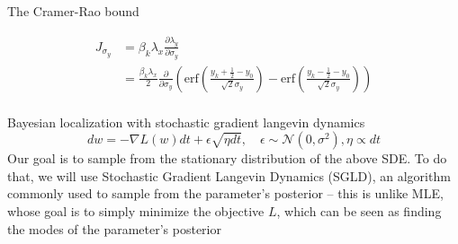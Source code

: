\documentclass[aspectratio=169]{beamer}
\begin{document}
\begin{frame}{The Cramer-Rao bound}

\begin{align*}
J_{\sigma_{y}} &= \beta_{k}\lambda_{x}\frac{\partial \lambda_{y}}{\partial \sigma_{y}} \\
&= \frac{\beta_{k}\lambda_{x}}{2}\frac{\partial}{\partial \sigma_{y}}\left(\mathrm{erf}\left(\frac{y_{k}+\frac{1}{2}-y_{0}}{\sqrt{2}\sigma_{y}}\right) -\mathrm{erf}\left(\frac{y_{k}-\frac{1}{2}-y_{0}}{\sqrt{2}\sigma_{y}}\right)\right)\\
\end{align*}



\end{frame}

\begin{frame}{Bayesian localization with stochastic gradient langevin dynamics}
$$dw = - \nabla L(w) dt + \epsilon \sqrt{\eta dt}, \quad \epsilon \sim \mathcal N(0, \sigma^2), \eta \propto dt$$
Our goal is to sample from the stationary distribution of the above SDE. To do that, we will use Stochastic Gradient Langevin Dynamics (SGLD), an algorithm commonly used to sample from the parameter's posterior -- this is unlike MLE, whose goal is to simply minimize the objective $L$, which can be seen as finding the modes of the parameter's posterior
\end{frame}
\end{document}
